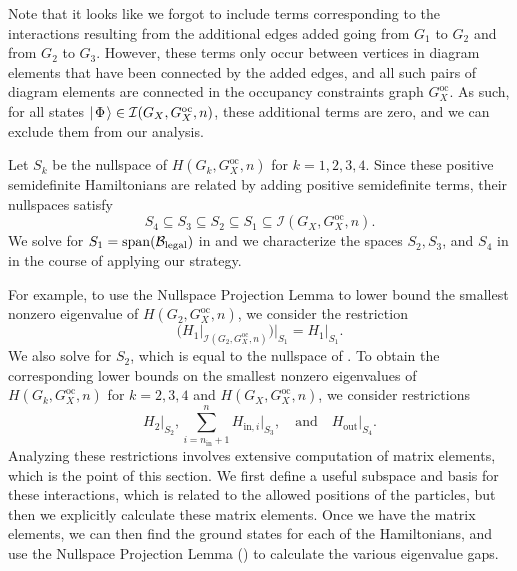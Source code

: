 \documentclass[../thesis-main/thesis-main]{subfiles}
\begin{document}
Note that it looks like we forgot to include terms corresponding to the interactions resulting from the additional edges added going from $G_1$ to $G_2$ and from $G_2$ to $G_3$.  However, these terms only occur between vertices in diagram elements that have been connected by the added edges, and all such pairs of diagram elements are connected in the occupancy constraints graph $G_X^{\text{oc}}$.  As such, for all states $|\mspace{2mu} \Phi \mspace{2mu} \rangle \in \mathcal{I}(G_X,G_X^{\text{oc}},n)$, these additional terms are zero, and we can exclude them from our analysis.

Let $S_{k}$ be the nullspace of $H(G_{k},G_X^{\text{oc}},n)$ for $k=1,2,3,4$. Since these positive semidefinite Hamiltonians are related by adding positive semidefinite terms, their nullspaces satisfy 
\begin{equation}
S_{4}\subseteq S_{3}\subseteq S_{2}\subseteq S_{1}\subseteq\mathcal{\mathcal{I}}\left(G_X,G_X^{\text{oc}},n\right).
\end{equation}
We solve for $S_1=\operatorname{span}(\mathcal{B}_{\text{legal}})$ in  and we characterize the spaces $S_2,S_3$, and $S_4$ in  in the course of applying our strategy. 

For example, to use the Nullspace Projection Lemma to lower bound the smallest nonzero eigenvalue of $H(G_{2},G_X^{\text{oc}},n)$, we consider the restriction 
\begin{equation}
  \Big(H_{1}\big|_{\mathcal{I}(G_{2},G_X^{\text{oc}},n)}\Big)\Big|_{S_{1}}
  =H_{1}\big|_{S_{1}}.\label{eq:H1_restriction}
\end{equation}
We also solve for $S_2$, which is equal to the nullspace of . To obtain the corresponding lower bounds on the smallest nonzero eigenvalues of $H(G_{k},G_X^{\text{oc}},n)$ for $k=2,3,4$ and $H(G_X,G_X^{\text{oc}},n)$, we consider restrictions 
\begin{equation}
  H_{2}\big|_{S_{2}},
  \sum_{i=n_{\text{in}}+1}^{n}H_{\text{in},i}\big|_{S_{3}},\quad\text{and}\quad
  H_{\text{out}}\big|_{S_{4}}.
\end{equation}
Analyzing these restrictions involves extensive computation of matrix elements, which is the point of this section.  We first define a useful subspace and basis for these interactions, which is related to the allowed positions of the particles, but then we explicitly calculate these matrix elements.  Once we have the matrix elements, we can then find the ground states for each of the Hamiltonians, and use the Nullspace Projection Lemma () to calculate the various eigenvalue gaps.
\end{document}
